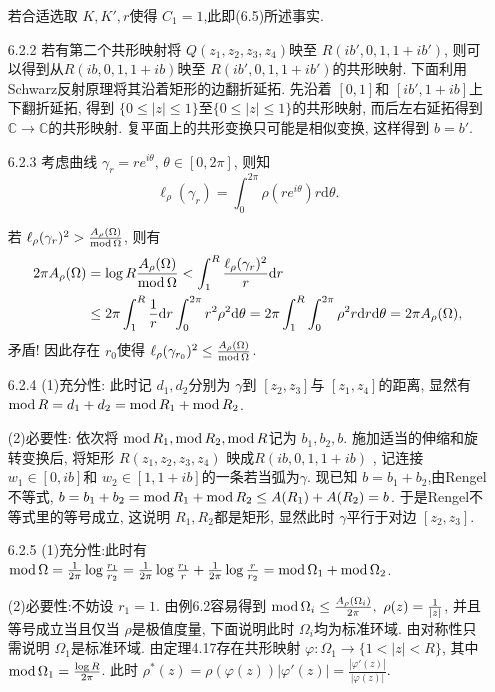 \begin{itemize}
    若合适选取 $K,K',r$使得 $C_1=1$,此即(6.5)所述事实.

    \item[6.2.2]若有第二个共形映射将 $Q(z_1,z_2,z_3,z_4)$映至 $R(ib',0,1,1+ib')$, 
    则可以得到从$R(ib ,0,1,1+ib )$映至 $R(ib',0,1,1+ib')$的共形映射.
    下面利用Schwarz反射原理将其沿着矩形的边翻折延拓. 
    先沿着 $[0,1]$和 $[ib',1+ib]$上下翻折延拓, 
    得到 $\{0\le |z|\le 1\}$至$\{0\le |z|\le 1\}$的共形映射, 
    而后左右延拓得到 $\mathbb{C}\to \mathbb{C}$的共形映射. 
    复平面上的共形变换只可能是相似变换, 这样得到 $b=b'$.

    \item[6.2.3]  考虑曲线 $\gamma_r = r e^{i\theta},\,\theta \in [0,2\pi]$, 则知
     $$\ell_\rho(\gamma_r) = \int_0^{2\pi} \rho(r e^{i\theta})r\mathrm{d}\theta. $$

     若  $\ell_\rho(\gamma_r)^2> \frac{A_\rho(\Omega)}{\operatorname{mod}\Omega}$, 则有
     \begin{align*}
        2 \pi A_\rho(\Omega) &= \log R \frac{A_\rho(\Omega)}{\operatorname{mod}\Omega} 
        <\int_1^R \frac{\ell_\rho(\gamma_r)^2}{r}\mathrm{d}r\\
        & \le2\pi  \int_1^R \frac{1}{r}\mathrm{d}r \int_0^{2\pi} r^2 \rho^2 \mathrm{d}\theta 
        = 2\pi \int_1^R\int_0^{2\pi} \rho^2 r\mathrm{d}r\mathrm{d}\theta 
        = 2\pi A_\rho(\Omega),
     \end{align*}
     矛盾! 因此存在 $r_0$使得 $\ell_\rho(\gamma_{r_0})^2
     \le  \frac{A_\rho(\Omega)}{\operatorname{mod}\Omega}$.

    \item[6.2.4] (1)充分性: 此时记 $d_1,d_2$分别为 
    $\gamma$到 $[z_2,z_3]$与 $[z_1,z_4]$的距离,
    显然有 $\operatorname{mod} R = d_1 + d_2 = \operatorname{mod} R_1+ \operatorname{mod} R_2$.
    
    (2)必要性: 依次将 $\operatorname{mod} R_1,\operatorname{mod} R_2,\operatorname{mod} R$记为 $b_1,b_2,b$.
    施加适当的伸缩和旋转变换后, 将矩形 $R(z_1,z_2,z_3,z_4)$ 映成$R(ib,0,1,1+ib) $ , 
    记连接 $w_1 \in [0,ib]$和 $w_2 \in [1,1+ib]$的一条若当弧为$\gamma$.
    现已知 $b = b_1+ b_2$,由Rengel不等式, 
    $b = b_1 + b_2 = \operatorname{mod} R_1+\operatorname{mod} R_2\le A(R_1)+A(R_2)= b $. 
    于是Rengel不等式里的等号成立, 这说明 $R_1,R_2$都是矩形, 
    显然此时 $\gamma$平行于对边 $[z_2,z_3]$.
    

    \item[6.2.5]  (1)充分性:此时有 $\operatorname{mod}\Omega 
    = \frac{1}{2\pi}\log \frac{r_1}{r_2} 
    =\frac{1}{2\pi}\log \frac{r_1}{r} + \frac{1}{2\pi}\log \frac{r}{r_2} 
    =\operatorname{mod}\Omega_1 + \operatorname{mod}\Omega_2$.
    
    (2)必要性:不妨设 $r_1=1$. 由例6.2容易得到 
    $\operatorname{mod}\Omega_i\le \frac{A_\rho(\Omega_i)}{2\pi},
    \ \rho(z) = \frac{1}{|z|}$, 并且等号成立当且仅当 $\rho$是极值度量, 
    下面说明此时 $\Omega_i$均为标准环域. 由对称性只需说明 $\Omega_1$是标准环域. 
    由定理4.17存在共形映射 $\varphi: \Omega_1\to \{1<|z|<R\}$, 
    其中 $\operatorname{mod}\Omega_1 = \frac{\log R}{2\pi}$. 
    此时 $\rho^*(z) = \rho(\varphi(z))|\varphi'(z)| 
    =\frac{ |\varphi'(z)|}{|\varphi(z)|}.$


\end{itemize}
